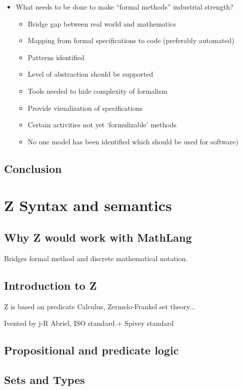 \begin{itemize}
\item What needs to be done to make “formal methods” industrial strength? 
\begin{itemize}
\item Bridge gap between real world and mathematics
\item Mapping from formal specifications to code (preferably automated)
\item Patterns identified
\item Level of abstraction should be supported
\item Tools needed to hide complexity of formalism
\item Provide visualization of specifications 
\item Certain activities not yet ‘formulizable’ methods
\item No one model has been identified which should be used for software)
\end{itemize}
\end{itemize}

\subsection{Conclusion}

\section{Z Syntax and semantics}
\label{sec:theznotation}

\subsection{Why Z would work with MathLang}

Bridges formal method and discrete mathematical notation.

\subsection{Introduction to Z}

Z is based on predicate Calculus, Zermelo-Frankel set theory...

Ivented by j-R Abriel, ISO standard.+ Spivey standard

\subsection{Propositional and predicate logic}

\subsection{Sets and Types}

